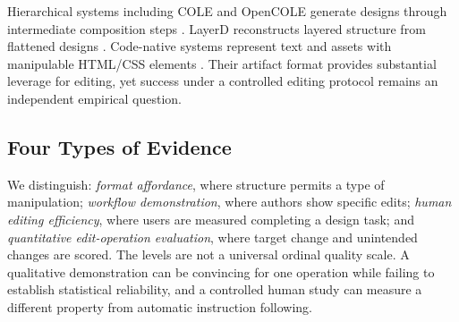 Hierarchical systems including COLE and OpenCOLE generate designs through intermediate composition steps \citep{cole2023,opencole2024}. LayerD reconstructs layered structure from flattened designs \citep{layerd2025}. Code-native systems represent text and assets with manipulable HTML/CSS elements \citep{designascode2026,editablevisual2026}. Their artifact format provides substantial leverage for editing, yet success under a controlled editing protocol remains an independent empirical question.

\subsection{Four Types of Evidence}
We distinguish: \emph{format affordance}, where structure permits a type of manipulation; \emph{workflow demonstration}, where authors show specific edits; \emph{human editing efficiency}, where users are measured completing a design task; and \emph{quantitative edit-operation evaluation}, where target change and unintended changes are scored. The levels are not a universal ordinal quality scale. A qualitative demonstration can be convincing for one operation while failing to establish statistical reliability, and a controlled human study can measure a different property from automatic instruction following.
